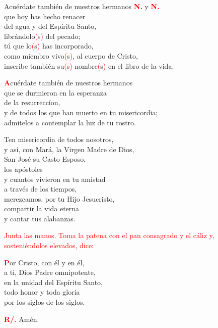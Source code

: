 \documentclass[12pt, letterpaper]{report}
\begin{document}
\noindent
Acu\'erdate tambi\'en de nuestros hermanos {\bfseries \textcolor{red}{N.}} y {\bfseries \textcolor{red}{N.}} \\
que hoy has hecho renacer \\
del agua y del Esp\'iritu Santo, \\
libr\'andolo\textcolor{red}{(}s\textcolor{red}{)} del pecado; \\
t\'u que lo\textcolor{red}{(}s\textcolor{red}{)} has incorporado, \\
como miembro vivo\textcolor{red}{(}s\textcolor{red}{)}, al cuerpo de Cristo, \\
inscribe tambi\'en su\textcolor{red}{(}s\textcolor{red}{)} nombre\textcolor{red}{(}s\textcolor{red}{)} en el libro de la vida.

\lettrine[lines=1]{\bfseries \textcolor{red}{A}}{}\Large cu\'erdate tambi\'en de nuestros hermanos\\
que se durmieron en la esperanza\\
de la resurrecc\'ion,\\
y de todos los que han muerto en tu misericordia;\\
admitelos a contemplar la luz de tu rostro.

\noindent
Ten misericordia de todos nosotros,\\
y as\'i, con Mar\'a, la Virgen Madre de Dios,\\
San Jos\'e su Casto Esposo, \\
los ap\'ostoles\\
y cuantos vivieron en tu amistad\\
a trav\'es de los tiempos,\\
merezcamos, por tu Hijo Jesucristo,\\
compartir la vida eterna\\
y cantar tus alabanzas. 

\large{\textcolor{red}{Junta las manos. Toma la patena con el pan consagrado y el c\'aliz y, sosteni\'endolos elevados, dice:}}

\lettrine[lines=1]{\bfseries \textcolor{red}{P}}{}\Large or Cristo, con \'el y en \'el,\\
a ti, Dios Padre omnipotente,\\
en la unidad del Esp\'iritu Santo,\\
todo honor y toda gloria\\
por los siglos de los siglos.

\Large {\bfseries \textcolor{red}{R/.}} \hspace{0.5cm} Am\'en.
\end{document}

